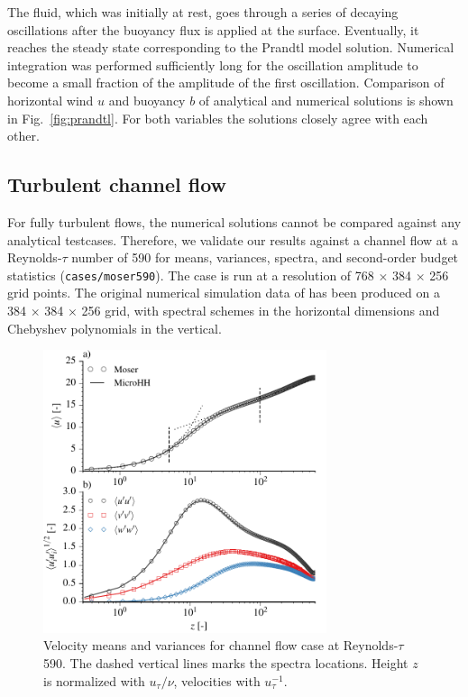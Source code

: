 \documentclass[gmd,manuscript]{copernicus}
\begin{document}
The fluid, which was initially at rest, goes through a series of decaying oscillations after the  buoyancy flux is applied at the surface. Eventually, it reaches the steady state corresponding to the Prandtl model solution. Numerical integration was performed sufficiently long for the oscillation amplitude to become a small fraction of the amplitude of the first oscillation. Comparison of horizontal wind $u$ and buoyancy $b$ of analytical and numerical solutions is shown in Fig.~\ref{fig:prandtl}. For both variables the solutions closely agree with each other.

\subsection{Turbulent channel flow}
For fully turbulent flows, the numerical solutions cannot be compared against any analytical testcases. Therefore, we validate our results against a channel flow at a Reynolds-$\tau$  number of 590 \citep{Moser1999} for means, variances, spectra, and second-order budget statistics (\texttt{cases/moser590}). The case is run at a resolution of 768 $\times$ 384 $\times$ 256 grid points. The original numerical simulation data of \citet{Moser1999} has been produced on a 384 $\times$ 384 $\times$ 256 grid, with spectral schemes in the horizontal dimensions and Chebyshev polynomials in the vertical.
\begin{figure}[t]
	\vspace*{2mm}
	\begin{center}
		\includegraphics[width=8.3cm]{figs/gmd_m590_umean_var.pdf}
	\end{center}
	\caption{Velocity means and variances for \citet{Moser1999} channel flow case at Reynolds-$\tau$ 590. The dashed vertical lines marks the spectra locations. Height $z$ is normalized with $u_\tau / \nu$, velocities with $u_\tau^{-1}$.}\label{fig:moser_velocity}
\end{figure}
\end{document}
